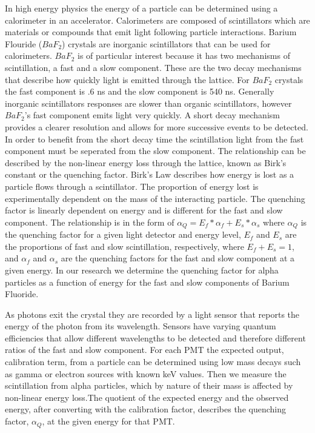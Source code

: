\documentclass{article}
\begin{document}
In high energy physics the energy of a particle can be determined using a calorimeter in an accelerator. Calorimeters are composed of scintillators which are materials or compounds that emit light following particle interactions. Barium Flouride ($BaF_2$) crystals are inorganic scintillators that can be used for calorimeters. $BaF_2$ is of particular interest because it has two mechanisms of scintillation, a fast and a slow component. These are the two decay mechanisms that describe how quickly light is emitted through the lattice. For $BaF_2$ crystals the fast component is .6 ns and the slow component is 540 ns. Generally inorganic scintillators responses are slower than organic scintillators, however $BaF_2$'s fast component emits light very quickly. A short decay mechanism provides a clearer resolution and allows for more successive events to be detected. In order to benefit from the short decay time the scintillation light from the fast component must be seperated from the slow component. The relationship can be described by the non-linear energy loss through the lattice, known as Birk's constant or the quenching factor. Birk's Law describes how energy is lost as a particle flows through a scintillator. The proportion of energy lost is experimentally dependent on the mass of the interacting particle. The quenching factor is linearly dependent on energy and is different for the fast and slow component. The relationship is in the form of $\alpha_Q = E_f * \alpha_f + E_s * \alpha_s$ where $\alpha_Q$ is the quenching factor for a given light detector and energy level, $E_f$ and $E_s$ are the proportions of fast and slow scintillation, respectively, where $E_f + E_s = 1$, and $\alpha_f$ and $\alpha_s$ are the quenching factors for the fast and slow component at a given energy. In our research we determine the quenching factor for alpha particles as a function of energy for the fast and slow components of Barium Fluoride.

As photons exit the crystal they are recorded by a light sensor that reports the energy of the photon from its wavelength. Sensors have varying quantum efficiencies that allow different wavelengths to be detected and therefore different ratios of the fast and slow component. For each PMT the expected output, calibration term, from a particle can be determined using low mass decays such as gamma or electron sources with known keV values. Then we measure the scintillation from alpha particles, which by nature of their mass is affected by non-linear energy loss.The quotient of the expected energy and the observed energy, after converting with the calibration factor, describes the quenching factor, $\alpha_Q$, at the given energy for that PMT. 
\end{document}
